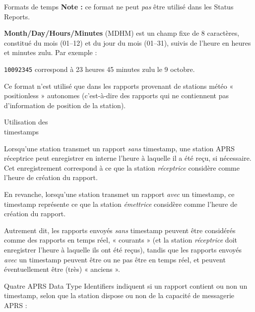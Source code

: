 \begin{aprssideblock}{Formats de temps}
\textbf{Note :} ce format ne peut \emph{pas} être utilisé dans les
Status Reports.

\textbf{Month/Day/Hours/Minutes} (MDHM) est un champ fixe de
8 caractères, constitué du mois (01--12) et du jour du mois (01--31),
suivis de l'heure en heures et minutes zulu. Par exemple :

\begin{aprsexample}
\texttt{10092345} \exgap correspond à 23 heures 45 minutes zulu le
9 octobre.
\end{aprsexample}

Ce format n'est utilisé que dans les rapports provenant de stations
météo « positionless » autonomes (c'est-à-dire des rapports qui ne
contiennent pas d'information de position de la station).
\end{aprssideblock}

\begin{aprssideblock}{Utilisation des\\timestamps}
\label{utilisation-des-timestamps}
Lorsqu'une station transmet un rapport \emph{sans} timestamp, une
station APRS réceptrice peut enregistrer en interne l'heure à laquelle
il a été reçu, si nécessaire. Cet enregistrement correspond à ce que la
station \emph{réceptrice} considère comme l'heure de création du
rapport.

En revanche, lorsqu'une station transmet un rapport \emph{avec} un
timestamp, ce timestamp représente ce que la station \emph{émettrice}
considère comme l'heure de création du rapport.

Autrement dit, les rapports envoyés \emph{sans} timestamp peuvent être
considérés comme des rapports en temps réel, « courants » (et la
station \emph{réceptrice} doit enregistrer l'heure à laquelle ils ont
été reçus), tandis que les rapports envoyés \emph{avec} un timestamp
peuvent être ou ne pas être en temps réel, et peuvent éventuellement
être (très) « anciens ».

Quatre APRS Data Type Identifiers indiquent si un rapport contient ou
non un timestamp, selon que la station dispose ou non de la capacité de
messagerie APRS :
\end{aprssideblock}

